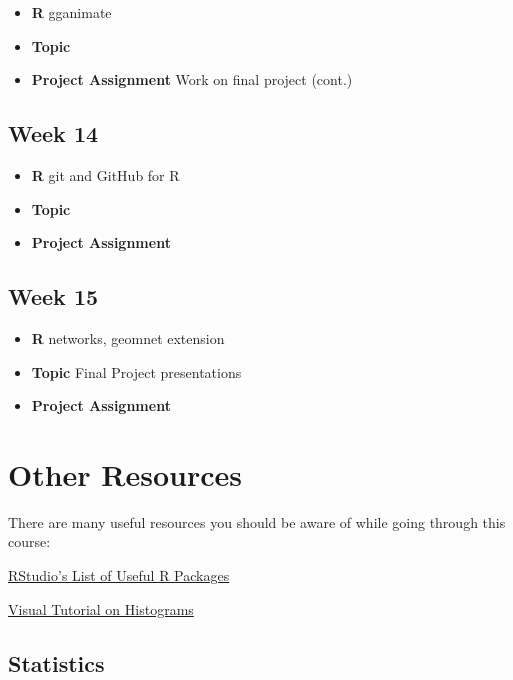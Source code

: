 \documentclass[]{book}
\providecommand{\tightlist}{%
  \setlength{\itemsep}{0pt}\setlength{\parskip}{0pt}}
\theoremstyle{definition}
\theoremstyle{definition}
\theoremstyle{remark}
\begin{document}
\begin{itemize}
\tightlist
\item
  \textbf{R} gganimate 
\item
  \textbf{Topic}
\item
  \textbf{Project Assignment} Work on final project (cont.)
\end{itemize}

\subsection*{Week 14}\label{week-14}

\begin{itemize}
\tightlist
\item
  \textbf{R} git and GitHub for R
\item
  \textbf{Topic}
\item
  \textbf{Project Assignment}
\end{itemize}

\subsection*{Week 15}\label{week-15}

\begin{itemize}
\tightlist
\item
  \textbf{R} networks, geomnet extension 
\item
  \textbf{Topic} Final Project presentations
\item
  \textbf{Project Assignment}
\end{itemize}

\section*{Other Resources}\label{other-resources}

There are many useful resources you should be aware of while going
through this course:

\href{https://github.com/rstudio/RStartHere}{RStudio's List of Useful R
Packages}

\href{http://tinlizzie.org/histograms/}{Visual Tutorial on Histograms}

\subsection*{Statistics}\label{statistics}
\end{document}
